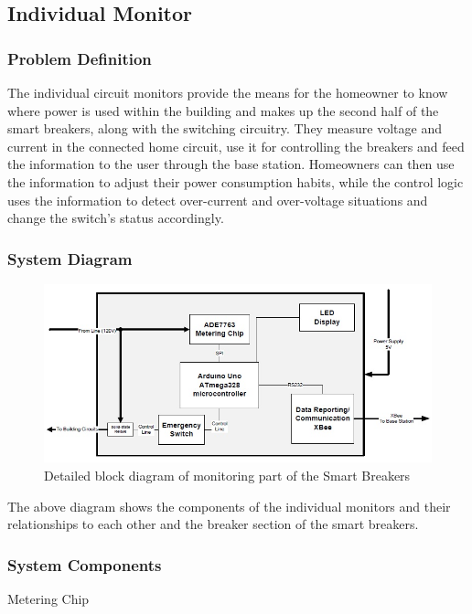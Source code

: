 
\subsection{Individual Monitor}
\subsubsection{Problem Definition}
The individual circuit monitors provide the means for the homeowner to know where power is used within the building and makes up the second half of the smart breakers, along with the switching circuitry. They measure voltage and current in the connected home circuit, use it for controlling the breakers and feed the information to the user through the base station. Homeowners can then use the information to adjust their power consumption habits, while the control logic uses the information to detect over-current and over-voltage situations and change the switch's status accordingly. 

\subsubsection{System Diagram}
\begin{figure}[htbp]
\begin{center}
\includegraphics[width=6in]{includes/NJSmartBreakerMonitor}
\caption{Detailed block diagram of monitoring part of the Smart Breakers}
\label{fig:monitor_system_diagram}
\end{center}
\end{figure}

The above diagram shows the components of the individual monitors and their relationships to each other and the breaker section of the smart breakers. 

\subsubsection{System Components}
Metering Chip

